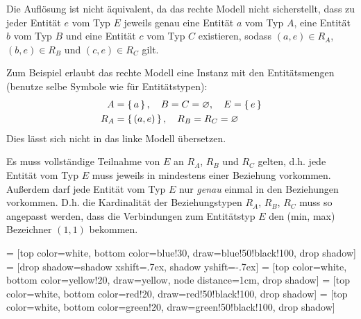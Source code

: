 \documentclass[a4paper,11pt]{article}             %
\begin{document}
\setcounter{excnt}{6}
\begin{ex}
\begin{exlist}
  \leavevmode
  \item 
Die Auflösung ist nicht äquivalent, da das rechte Modell nicht sicherstellt,
dass zu jeder Entität $e$ vom Typ $E$ jeweils genau eine Entität $a$ vom Typ $A$,
eine Entität $b$ vom Typ $B$ und eine Entität $c$ vom Typ $C$ existieren, 
sodass $(a,e)\in R_A$, $(b,e)\in R_B$ und $(c,e)\in R_C$ gilt.

Zum Beispiel erlaubt das rechte Modell eine Instanz mit den Entitätsmengen
(benutze selbe Symbole wie für Entitätstypen):
\begin{align*}
  A&=\set{a},\quad B=C=\varnothing,\quad E=\set{e} \\
  R_A&=\set{(a,e)},\quad R_B=R_C=\varnothing
\end{align*}
Dies lässt sich nicht in das linke Modell übersetzen.

\item
Es muss vollständige Teilnahme von $E$ an $R_A$, $R_B$ und $R_C$ gelten, d.h.
jede Entität vom Typ $E$ muss jeweils in mindestens einer Beziehung vorkommen.
Außerdem darf jede Entität vom Typ $E$ nur \emph{genau} einmal in den
Beziehungen vorkommen. D.h. die Kardinalität der Beziehungstypen $R_A$, $R_B$,
$R_C$ muss so angepasst werden, dass die Verbindungen zum Entitätstyp $E$ den
(min, max) Bezeichner $(1,1)$ bekommen. 
\vspace{2cm}
\item

  \begin{center}
\usetikzlibrary{positioning}
\usetikzlibrary{shadows}

 = [top color=white, bottom color=blue!30, 
                            draw=blue!50!black!100, drop shadow]
 = [drop shadow={shadow xshift=.7ex, 
                                 shadow yshift=-.7ex}]
 = [top color=white, bottom color=yellow!20, 
                               draw=yellow, node distance=1cm, drop shadow]
 = [top color=white, bottom color=red!20, 
                                  draw=red!50!black!100, drop shadow]
 = [top color=white, bottom color=green!20, 
                         draw=green!50!black!100, drop shadow]

\resizebox{0.8\textwidth}{!}{
\begin{tikzpicture}[node distance=1.5cm, every edge/.style={link},baseline]


\end{tikzpicture}}
\end{center}
\end{exlist}
\end{ex}
\end{document}
